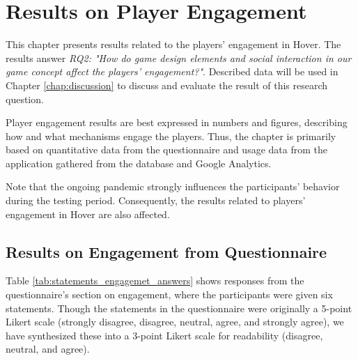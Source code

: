 \section{Results on Player Engagement}
\label{chap:player_engagement}
This chapter presents results related to the players’ engagement in Hover. The results answer \textit{RQ2: "How do game design elements and social interaction in our game concept affect the players’ engagement?"}. Described data will be used in Chapter \ref{chap:discussion} to discuss and evaluate the result of this research question.

Player engagement results are best expressed in numbers and figures, describing how and what mechanisms engage the players. Thus, the chapter is primarily based on quantitative data from the questionnaire and usage data from the application gathered from the database and Google Analytics.

Note that the ongoing pandemic strongly influences the participants’ behavior during the testing period. Consequently, the results related to players’ engagement in Hover are also affected.

\subsection{Results on Engagement from Questionnaire}
Table \ref{tab:statements_engagemet_answers} shows responses from the questionnaire’s section on engagement, where the participants were given six statements. Though the statements in the questionnaire were originally a 5-point Likert scale (strongly disagree, disagree, neutral, agree, and strongly agree), we have synthesized these into a 3-point Likert scale for readability (disagree, neutral, and agree). 

